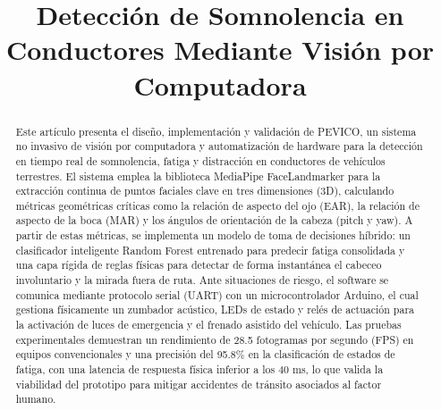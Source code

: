 \documentclass[conference]{IEEEtran}
\begin{document}
\title{Detección de Somnolencia en Conductores Mediante Visión por Computadora}

\author{
\and
{}

}

\maketitle

\begin{abstract}
Este artículo presenta el diseño, implementación y validación de PEVICO, un sistema no invasivo de visión por computadora y automatización de hardware para la detección en tiempo real de somnolencia, fatiga y distracción en conductores de vehículos terrestres. El sistema emplea la biblioteca MediaPipe FaceLandmarker para la extracción continua de puntos faciales clave en tres dimensiones (3D), calculando métricas geométricas críticas como la relación de aspecto del ojo (EAR), la relación de aspecto de la boca (MAR) y los ángulos de orientación de la cabeza (pitch y yaw). A partir de estas métricas, se implementa un modelo de toma de decisiones híbrido: un clasificador inteligente Random Forest entrenado para predecir fatiga consolidada y una capa rígida de reglas físicas para detectar de forma instantánea el cabeceo involuntario y la mirada fuera de ruta. Ante situaciones de riesgo, el software se comunica mediante protocolo serial (UART) con un microcontrolador Arduino, el cual gestiona físicamente un zumbador acústico, LEDs de estado y relés de actuación para la activación de luces de emergencia y el frenado asistido del vehículo. Las pruebas experimentales demuestran un rendimiento de 28.5 fotogramas por segundo (FPS) en equipos convencionales y una precisión del 95.8\% en la clasificación de estados de fatiga, con una latencia de respuesta física inferior a los 40 ms, lo que valida la viabilidad del prototipo para mitigar accidentes de tránsito asociados al factor humano.
\end{abstract}
\end{document}
